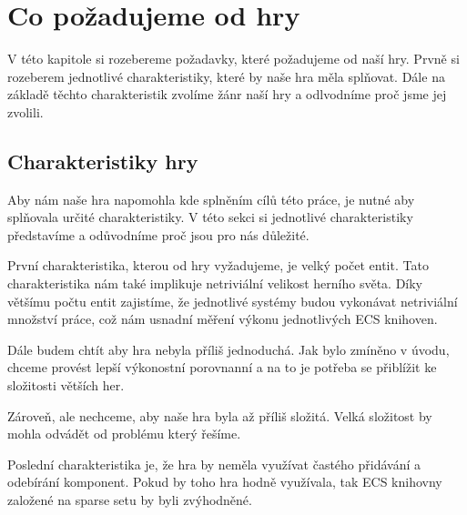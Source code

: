 \chapter{Co požadujeme od hry}
V této kapitole si rozebereme požadavky, které požadujeme od naší hry. Prvně si rozeberem jednotlivé charakteristiky, které by naše hra měla splňovat. Dále na základě těchto charakteristik zvolíme žánr naší hry a odlvodníme proč jsme jej zvolili.


\section{Charakteristiky hry}
Aby nám naše hra napomohla kde splněním cílů této práce, je nutné aby splňovala určité charakteristiky. V této sekci si jednotlivé charakteristiky představíme a odůvodníme proč jsou pro nás důležité.

První charakteristika, kterou od hry vyžadujeme, je velký počet entit. Tato charakteristika nám také implikuje netriviální velikost herního světa. Díky většímu počtu entit zajistíme, že jednotlivé systémy budou vykonávat netriviální množství práce, což nám usnadní měření výkonu jednotlivých ECS knihoven.

Dále budem chtít aby hra nebyla příliš jednoduchá. Jak bylo zmíněno v úvodu, chceme provést lepší výkonostní porovnanní a na to je potřeba se přiblížit ke složitosti větších her.

Zároveň, ale nechceme, aby naše hra byla až příliš složitá. Velká složitost by mohla odvádět od problému který řešíme.

Poslední charakteristika je, že hra by neměla využívat častého přidávání a odebírání komponent. Pokud by toho hra hodně využívala, tak ECS knihovny založené na sparse setu by byli zvýhodněné.


